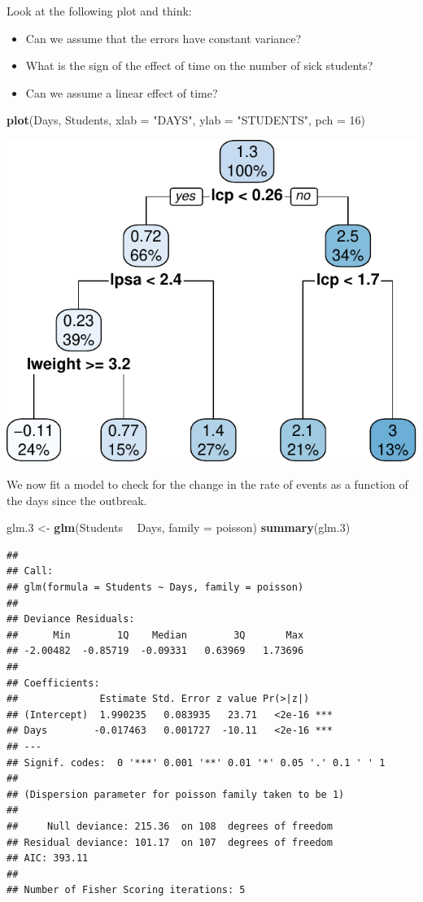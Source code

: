 \documentclass[]{book}
\newenvironment{Shaded}{\begin{snugshade}}{\end{snugshade}}
\newcommand{\KeywordTok}[1]{\textcolor[rgb]{0.13,0.29,0.53}{\textbf{#1}}}
\newcommand{\DataTypeTok}[1]{\textcolor[rgb]{0.13,0.29,0.53}{#1}}
\newcommand{\DecValTok}[1]{\textcolor[rgb]{0.00,0.00,0.81}{#1}}
\newcommand{\StringTok}[1]{\textcolor[rgb]{0.31,0.60,0.02}{#1}}
\newcommand{\OperatorTok}[1]{\textcolor[rgb]{0.81,0.36,0.00}{\textbf{#1}}}
\newcommand{\NormalTok}[1]{#1}
\providecommand{\tightlist}{%
  \setlength{\itemsep}{0pt}\setlength{\parskip}{0pt}}
\theoremstyle{definition}
\theoremstyle{definition}
\theoremstyle{definition}
\theoremstyle{remark}
\begin{document}
Look at the following plot and think:

\begin{itemize}
\tightlist
\item
  Can we assume that the errors have constant variance?
\item
  What is the sign of the effect of time on the number of sick students?
\item
  Can we assume a linear effect of time?
\end{itemize}

\begin{Shaded}
\begin{Highlighting}[]
\KeywordTok{plot}\NormalTok{(Days, Students, }\DataTypeTok{xlab =} \StringTok{"DAYS"}\NormalTok{, }\DataTypeTok{ylab =} \StringTok{"STUDENTS"}\NormalTok{, }\DataTypeTok{pch =} \DecValTok{16}\NormalTok{)}
\end{Highlighting}
\end{Shaded}

\includegraphics[width=0.5\linewidth]{Rcourse_files/figure-latex/unnamed-chunk-193-1}

We now fit a model to check for the change in the rate of events as a
function of the days since the outbreak.

\begin{Shaded}
\begin{Highlighting}[]
\NormalTok{glm.}\DecValTok{3}\NormalTok{ <-}\StringTok{ }\KeywordTok{glm}\NormalTok{(Students }\OperatorTok{~}\StringTok{ }\NormalTok{Days, }\DataTypeTok{family =}\NormalTok{ poisson)}
\KeywordTok{summary}\NormalTok{(glm.}\DecValTok{3}\NormalTok{)}
\end{Highlighting}
\end{Shaded}

\begin{verbatim}
## 
## Call:
## glm(formula = Students ~ Days, family = poisson)
## 
## Deviance Residuals: 
##      Min        1Q    Median        3Q       Max  
## -2.00482  -0.85719  -0.09331   0.63969   1.73696  
## 
## Coefficients:
##              Estimate Std. Error z value Pr(>|z|)    
## (Intercept)  1.990235   0.083935   23.71   <2e-16 ***
## Days        -0.017463   0.001727  -10.11   <2e-16 ***
## ---
## Signif. codes:  0 '***' 0.001 '**' 0.01 '*' 0.05 '.' 0.1 ' ' 1
## 
## (Dispersion parameter for poisson family taken to be 1)
## 
##     Null deviance: 215.36  on 108  degrees of freedom
## Residual deviance: 101.17  on 107  degrees of freedom
## AIC: 393.11
## 
## Number of Fisher Scoring iterations: 5
\end{verbatim}
\end{document}
